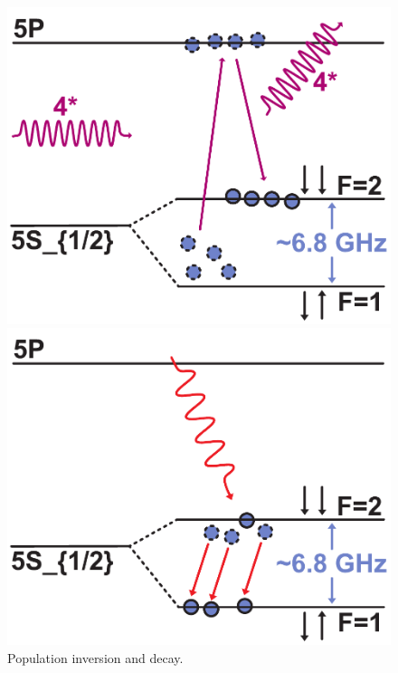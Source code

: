 \begin{figure}[H]
    \centering

    \begin{minipage}[t]{0.3\linewidth}
        \centering
        \includegraphics[width=\linewidth]{pdf/MODR/pumping-decay.pdf}
        \caption{Population inversion and decay.}
        \label{fig:MODR-pumping-decay}
    \end{minipage}
    \hfill
    \begin{minipage}[t]{0.3\linewidth}
        \centering
        \includegraphics[width=\linewidth]{pdf/MODR/microwave.pdf}

\end{minipage}
\end{figure}
